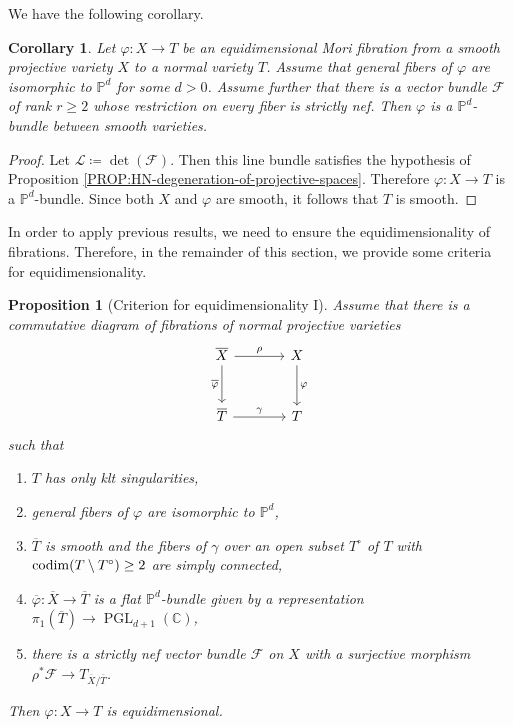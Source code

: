 \documentclass[english,reqno]{amsart}
\newcommand\bbC{{\mathbb C}}
\newcommand\bbP{{\mathbb P}}
\newcommand\sF{{\mathscr F}}
\newcommand\sL{{\mathscr L}}
\newcommand{\codim}{{\rm codim}}
\DeclareMathOperator*{\PGL}{PGL}
\theoremstyle{plain}
\newtheorem{prop}[thm]{Proposition}
\newtheorem{cor}[thm]{Corollary}
\theoremstyle{definition}
\numberwithin{equation}{section} %
\begin{document}
We have the following corollary.


\begin{cor}\label{cor-equidim-implies-bundle}
	Let $\varphi \colon X\to T$ be an equidimensional Mori fibration from a smooth projective variety $X$ to a normal variety $T$. Assume that general fibers of $\varphi$ are isomorphic to $\bbP^d$ for some $d>0$. Assume further that there is a vector bundle $\sF$ of rank $r\geqslant 2$ whose restriction on every fiber is strictly nef. Then $\varphi$ is a $\mathbb{P}^d$-bundle between smooth varieties.
\end{cor}
\begin{proof}
	Let  $\sL\coloneqq \det(\sF)$. Then this line bundle satisfies the hypothesis of Proposition \ref{PROP:HN-degeneration-of-projective-spaces}. 
	Therefore $\varphi\colon X\rightarrow T$ is   a $\bbP^d$-bundle. Since both $X$ and $\varphi$ are smooth, it follows that $T$ is smooth.
\end{proof}








In order to apply  previous results, we need to ensure the equidimensionality of fibrations. Therefore, in the  remainder of this section,  we provide some criteria  for equidimensionality.

\begin{prop}[Criterion for equidimensionality I]
	\label{prop:equidimensionality-criterion-I}
	Assume that there is a commutative diagram  of fibrations of normal projective varieties
	\[
	\begin{tikzcd}[column sep=large, row sep=large]
	\overline{X}\dar[swap]{\overline{\varphi}} \rar{\rho} &  X\dar{{\varphi}} \\
	\overline{T} \rar{\gamma}& T
	\end{tikzcd}
	\]
	such that
	\begin{enumerate}
		\item $T$ has only klt singularities,
		\item general fibers of $\varphi$ are isomorphic to $\bbP^d$,
		\item $\overline T$ is smooth and the fibers of $\gamma$ over an open subset $T^\circ$ of $T$ with $\codim(T\setminus T^\circ)\geq 2$ are simply connected,
		\item  $\overline{\varphi}\colon \overline{X}\rightarrow \overline{T}$ is a flat $\mathbb{P}^d$-bundle given by a representation $\pi_1(\overline{T})\rightarrow \PGL_{d+1}(\bbC)$,
		\item there is a strictly nef vector bundle $\sF$ on $X$ with a surjective morphism $\rho^*\sF\rightarrow T_{\overline{X}/\overline{T}}$.
	\end{enumerate}
	Then $\varphi\colon X\rightarrow T$ is equidimensional.
\end{prop}
\end{document}
